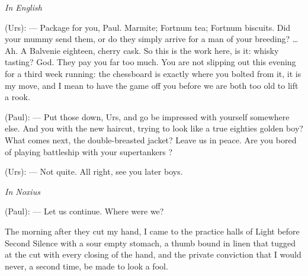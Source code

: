 
\begin{room}

\textit{In English}

(Urs): --- Package for you, Paul. Marmite; Fortnum tea; Fortnum biscuits. Did your mummy send them, or do they simply arrive for a man of your breeding? \ldots{} Ah. A Balvenie eighteen, cherry cask. So this is the work here, is it: whisky tasting? God. They pay you far too much. You are not slipping out this evening for a third week running: the chessboard is exactly where you bolted from it, it is my move, and I mean to have the game off you before we are both too old to lift a rook.

(Paul): --- Put those down, Urs, and go be impressed with yourself somewhere else. And you with the new haircut, trying to look like a true eighties golden boy? What comes next, the double-breasted jacket? Leave us in peace. Are you bored of playing battleship with your supertankers ?

(Urs): --- Not quite. All right, see you later boys.

\textit{In Noxius}

(Paul): --- Let us continue. Where were we?

\end{room}

The morning after they cut my hand, I came to the practice halls of Light before Second Silence with a sour empty stomach, a thumb bound in linen that tugged at the cut with every closing of the hand, and the private conviction that I would never, a second time, be made to look a fool.\par

